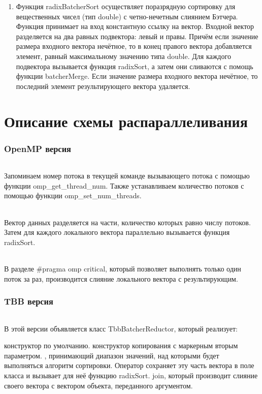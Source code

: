 \documentclass[12pt,a4paper]{article}
\begin{document}
\begin{enumerate}
\item{Функция radixBatcherSort} осуществляет поразрядную сортировку для вещественных чисел (тип
double) с четно-нечетным слиянием Бэтчера. Функция принимает на вход константную ссылку на вектор. Входной вектор разделяется на два равных подвектора: левый и правы. Причём если значение размера входного вектора нечётное, то в конец правого вектора добавляется элемент, равный максимальному значению типа double. Для каждого подвектора вызывается функция radixSort, а затем они сливаются с помощь функции batcherMerge. Если значение размера входного вектора нечётное, то последний элемент результирующего вектора удаляется.
\end{enumerate} 

\newpage
\part*{Описание схемы распараллеливания}
\section*{OpenMP версия}
\paragraph{}Запоминаем номер потока в текущей команде вызывающего потока с помощью функции omp\_get\_thread\_num. Также устанавливаем количество потоков с помощью функции omp\_set\_num\_threads. 
\paragraph{}Вектор данных разделяется на части, количество которых равно числу потоков. Затем для каждого локального вектора параллельно вызывается функция radixSort.
\paragraph{}В разделе \#pragma omp critical, который позволяет выполнять только один поток за раз, производится слияние локального вектора с результирующим.

\section*{TBB версия}
\paragraph{}В этой версии объявляется класс TbbBatcherReductor, который реализует:
\begin{enumerate} 
 конструктор по умолчанию.
 конструктор копирования с маркерным вторым параметром.
, принимающий диапазон значений, над которыми будет выполняться алгоритм сортировки. Оператор сохраняет эту часть вектора в поле класса и вызывает для неё функцию radixSort.
 join, который производит слияние своего вектора с вектором объекта, переданного аргументом.
\end{enumerate} 
\end{document}
